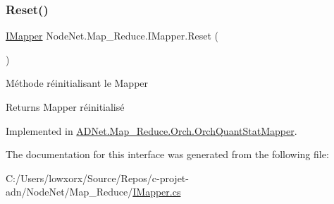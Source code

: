 \mbox{\label{interface_node_net_1_1_map___reduce_1_1_i_mapper_a5cf335d5f21ae6bc32c774b947119134}} 
\subsubsection{\texorpdfstring{Reset()}{Reset()}}
{\footnotesize\ttfamily \hyperlink{interface_node_net_1_1_map___reduce_1_1_i_mapper}{I\+Mapper} Node\+Net.\+Map\+\_\+\+Reduce.\+I\+Mapper.\+Reset (\begin{DoxyParamCaption}{ }\end{DoxyParamCaption})}



Méthode réinitialisant le Mapper 

\begin{DoxyReturn}{Returns}
Mapper réinitialisé
\end{DoxyReturn}


Implemented in \hyperlink{class_a_d_net_1_1_map___reduce_1_1_orch_1_1_orch_quant_stat_mapper_a374ab1b409195fbaeb104755028f2876}{A\+D\+Net.\+Map\+\_\+\+Reduce.\+Orch.\+Orch\+Quant\+Stat\+Mapper}.



The documentation for this interface was generated from the following file\+:\begin{DoxyCompactItemize}
\item 
C\+:/\+Users/lowxorx/\+Source/\+Repos/c-\/projet-\/adn/\+Node\+Net/\+Map\+\_\+\+Reduce/\hyperlink{_i_mapper_8cs}{I\+Mapper.\+cs}\end{DoxyCompactItemize}
